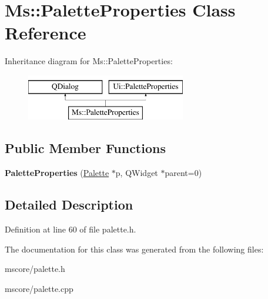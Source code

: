 \hypertarget{class_ms_1_1_palette_properties}{}\section{Ms\+:\+:Palette\+Properties Class Reference}
\label{class_ms_1_1_palette_properties}
Inheritance diagram for Ms\+:\+:Palette\+Properties\+:\begin{figure}[H]
\begin{center}
\leavevmode
\includegraphics[height=2.000000cm]{class_ms_1_1_palette_properties}
\end{center}
\end{figure}
\subsection*{Public Member Functions}
\begin{DoxyCompactItemize}
\item 
\mbox{\label{class_ms_1_1_palette_properties_a636f9876f67e005815fa7a56d4e18ebd}} 
{\bfseries Palette\+Properties} (\hyperlink{class_ms_1_1_palette}{Palette} $\ast$p, Q\+Widget $\ast$parent=0)
\end{DoxyCompactItemize}


\subsection{Detailed Description}


Definition at line 60 of file palette.\+h.



The documentation for this class was generated from the following files\+:\begin{DoxyCompactItemize}
\item 
mscore/palette.\+h\item 
mscore/palette.\+cpp\end{DoxyCompactItemize}
